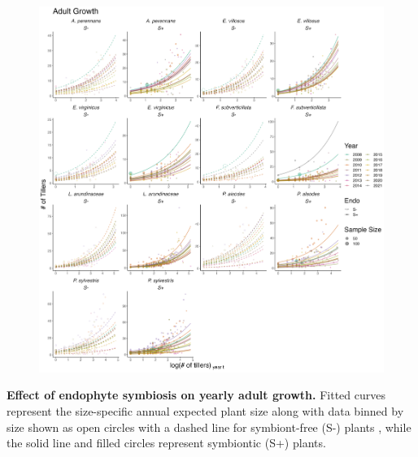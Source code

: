 \documentclass[12pt]{article}
\begin{document}
\begin{figure}[H]
	\centering
	\includegraphics[width=\linewidth]{grow_yearplot.png}
\end{figure}
 \textbf{Effect of endophyte symbiosis on yearly adult growth.} Fitted curves represent the size-specific annual expected plant size along with data binned by size shown as open circles with a dashed line for symbiont-free (S-) plants , while the solid line and filled circles represent symbiontic (S+) plants. 
\newpage
\end{document}
